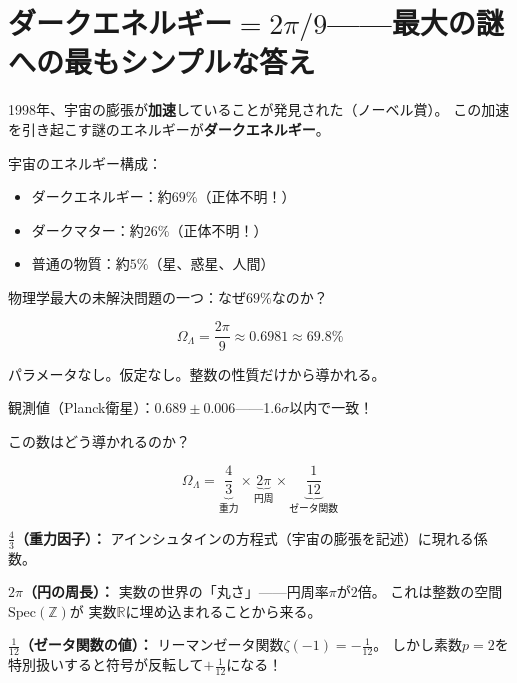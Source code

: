\documentclass[12pt,a4paper]{article}
\begin{document}
\section{ダークエネルギー$= 2\pi/9$——最大の謎への最もシンプルな答え}

\begin{ideabox}[ダークエネルギーとは]
1998年、宇宙の膨張が\textbf{加速}していることが発見された（ノーベル賞）。
この加速を引き起こす謎のエネルギーが\textbf{ダークエネルギー}。

宇宙のエネルギー構成：
\begin{itemize}
\item ダークエネルギー：約$69\%$（正体不明！）
\item ダークマター：約$26\%$（正体不明！）
\item 普通の物質：約$5\%$（星、惑星、人間）
\end{itemize}

物理学最大の未解決問題の一つ：なぜ$69\%$なのか？
\end{ideabox}

\begin{keybox}[WBの答え：$\Omega_\Lambda = 2\pi/9$]
\[
  \boxed{\Omega_\Lambda = \frac{2\pi}{9} \approx 0.6981 \approx 69.8\%}
\]

パラメータなし。仮定なし。整数の性質だけから導かれる。

観測値（Planck衛星）：$0.689 \pm 0.006$——1.6$\sigma$以内で一致！
\end{keybox}

この数はどう導かれるのか？

\begin{mathbox}[3つの因子]
\[
  \Omega_\Lambda = \underbrace{\frac{4}{3}}_{\text{重力}} \times
                   \underbrace{2\pi}_{\text{円周}} \times
                   \underbrace{\frac{1}{12}}_{\text{ゼータ関数}}
\]

\textbf{$\frac{4}{3}$（重力因子）：}
アインシュタインの方程式（宇宙の膨張を記述）に現れる係数。

\textbf{$2\pi$（円の周長）：}
実数の世界の「丸さ」——円周率$\pi$が$2$倍。
これは整数の空間$\mathrm{Spec}(\mathbb{Z})$が
実数$\mathbb{R}$に埋め込まれることから来る。

\textbf{$\frac{1}{12}$（ゼータ関数の値）：}
リーマンゼータ関数$\zeta(-1) = -\frac{1}{12}$。
しかし素数$p=2$を特別扱いすると符号が反転して$+\frac{1}{12}$になる！
\end{mathbox}
\end{document}
